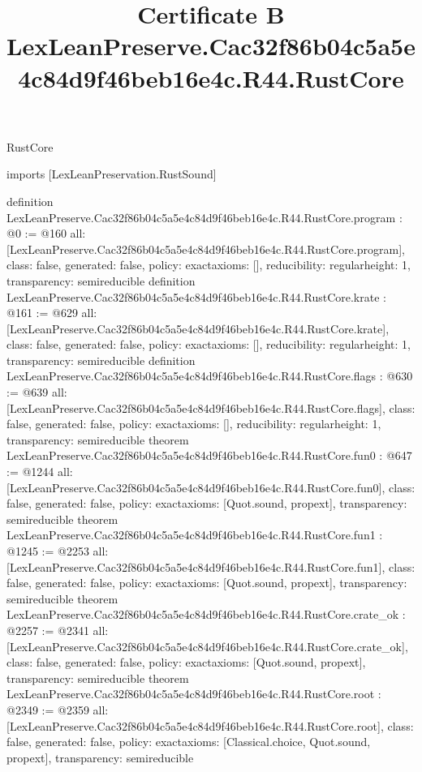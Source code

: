 \begin{lexlean}{RustCore}
\title{Certificate B LexLeanPreserve.Cac32f86b04c5a5e4c84d9f46beb16e4c.R44.RustCore}
\begin{coremodule}
imports [LexLeanPreservation.RustSound]

definition LexLeanPreserve.Cac32f86b04c5a5e4c84d9f46beb16e4c.R44.RustCore.program : @0 := @160 {
  all: [LexLeanPreserve.Cac32f86b04c5a5e4c84d9f46beb16e4c.R44.RustCore.program],
  class: false,
  generated: false,
  policy: exact{axioms: []},
  reducibility: regular{height: 1},
  transparency: semireducible
}
definition LexLeanPreserve.Cac32f86b04c5a5e4c84d9f46beb16e4c.R44.RustCore.krate : @161 := @629 {
  all: [LexLeanPreserve.Cac32f86b04c5a5e4c84d9f46beb16e4c.R44.RustCore.krate],
  class: false,
  generated: false,
  policy: exact{axioms: []},
  reducibility: regular{height: 1},
  transparency: semireducible
}
definition LexLeanPreserve.Cac32f86b04c5a5e4c84d9f46beb16e4c.R44.RustCore.flags : @630 := @639 {
  all: [LexLeanPreserve.Cac32f86b04c5a5e4c84d9f46beb16e4c.R44.RustCore.flags],
  class: false,
  generated: false,
  policy: exact{axioms: []},
  reducibility: regular{height: 1},
  transparency: semireducible
}
theorem LexLeanPreserve.Cac32f86b04c5a5e4c84d9f46beb16e4c.R44.RustCore.fun0 : @647 := @1244 {
  all: [LexLeanPreserve.Cac32f86b04c5a5e4c84d9f46beb16e4c.R44.RustCore.fun0],
  class: false,
  generated: false,
  policy: exact{axioms: [Quot.sound, propext]},
  transparency: semireducible
}
theorem LexLeanPreserve.Cac32f86b04c5a5e4c84d9f46beb16e4c.R44.RustCore.fun1 : @1245 := @2253 {
  all: [LexLeanPreserve.Cac32f86b04c5a5e4c84d9f46beb16e4c.R44.RustCore.fun1],
  class: false,
  generated: false,
  policy: exact{axioms: [Quot.sound, propext]},
  transparency: semireducible
}
theorem LexLeanPreserve.Cac32f86b04c5a5e4c84d9f46beb16e4c.R44.RustCore.crate_ok : @2257 := @2341 {
  all: [LexLeanPreserve.Cac32f86b04c5a5e4c84d9f46beb16e4c.R44.RustCore.crate_ok],
  class: false,
  generated: false,
  policy: exact{axioms: [Quot.sound, propext]},
  transparency: semireducible
}
theorem LexLeanPreserve.Cac32f86b04c5a5e4c84d9f46beb16e4c.R44.RustCore.root : @2349 := @2359 {
  all: [LexLeanPreserve.Cac32f86b04c5a5e4c84d9f46beb16e4c.R44.RustCore.root],
  class: false,
  generated: false,
  policy: exact{axioms: [Classical.choice, Quot.sound, propext]},
  transparency: semireducible
}


\end{coremodule}
\end{lexlean}
